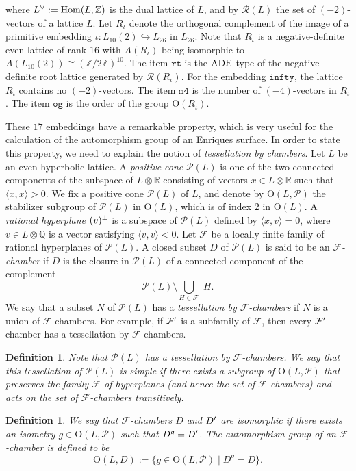\documentclass{amsart}
\newtheorem{_definition}[theorem]{Definition}
\newenvironment{definition}{\begin{_definition}\rm}{\end{_definition}}
\numberwithin{equation}{section}
\numberwithin{table}{section}
\numberwithin{figure}{section}
\newcommand{\Q}{\mathord{\mathbb  Q}}
\newcommand{\R}{\mathord{\mathbb R}}
\newcommand{\Z}{\mathord{\mathbb Z}}
\newcommand{\FFF}{\mathord{\mathcal F}}
\newcommand{\PPP}{\mathord{\mathcal P}}
\newcommand{\RRR}{\mathord{\mathcal R}}
\newcommand{\inj}{\hookrightarrow}
\newcommand{\set}[2]{\{ {#1}\mid {#2}  \}}
\newcommand{\tensor}{\otimes}
\newcommand{\sprime}{\sp\prime}
\newcommand{\sperp}{\sp{\perp}}
\newcommand{\dual}{\sp{\vee}}
\newcommand{\Hom}{\mathord{\mathrm{Hom}}}
\newcommand{\OG}{\mathord{\mathrm{O}}}
\newcommand{\ADE}{\mathord{\rm ADE}}
\newcommand{\intf}[1]{\langle #1 \rangle}
\newcommand{\OGP}[1]{\OG(#1, \PPP)}
\begin{document}
where $L\dual:=\Hom(L, \Z)$ is the dual lattice of $L$,
and by  $\RRR(L)$  the set of $(-2)$-vectors of a lattice $L$.
Let $R_{\iota}$ denote the orthogonal complement of the image of
a primitive embedding $\iota\colon L_{10}(2)\inj L_{26}$ in $L_{26}$.
Note that $R_{\iota}$ is a negative-definite even lattice of rank $16$
with  $A(R_{\iota})$ being isomorphic to $A(L_{10}(2))\cong (\Z/2\Z)^{10}$. %
The item $\texttt{rt}$ is the $\ADE$-type of the negative-definite root lattice
generated by  $\RRR(R_{\iota})$.
For the embedding %
$\texttt{infty}$, the lattice $R_{\iota}$ contains no $(-2)$-vectors.
The item $\texttt{m4}$ is the number of $(-4)$-vectors   in $R_{\iota}$.
The item $\texttt{og}$ is the order of the group  $\OG(R_{\iota})$.
\par
\medskip
These $17$ embeddings have a remarkable property,
which is very useful for the calculation of the automorphism group of
an Enriques surface.
In order to state this property,
we need to explain the notion of \emph{tessellation by chambers}.
Let $L$ be an even hyperbolic lattice.
A \emph{positive cone} $\PPP(L)$  is one of the two connected components
of the subspace of $L\tensor \R$ consisting of vectors $x\in L\tensor \R$
such that $\intf{x, x}>0$.
We fix a positive cone $\PPP(L)$ of $L$, and
denote by $\OGP{L}$
the stabilizer subgroup of $\PPP(L)$ in $\OG(L)$,
which is of index $2$ in $\OG(L)$.
A \emph{rational hyperplane} $(v)\sperp$ is a subspace of $\PPP(L)$ defined by
$\intf{x, v}=0$, where $v\in L\tensor \Q$ is a vector satisfying  $\intf{v, v}<0$.
Let $\FFF$ be a locally finite family of rational hyperplanes of $\PPP(L)$.
A closed subset $D$ of $\PPP(L)$ is said to be an \emph{$\FFF$-chamber} if
$D$ is the closure in $\PPP(L)$ of a connected component of
the complement
\[
\PPP(L)\setminus \bigcup_{H\in \FFF}\; H.
\]
We say that  a subset $N$ of $\PPP(L)$ has a \emph{tessellation by $\FFF$-chambers}
if $N$ is a union of $\FFF$-chambers.
For example, if $\FFF\sprime$ is a subfamily of $\FFF$,
then every $\FFF\sprime$-chamber has a tessellation by $\FFF$-chambers.
%
\begin{definition}
Note that  $\PPP(L)$ has a tessellation by $\FFF$-chambers.
We say that this tessellation of $\PPP(L)$
is \emph{simple} if there exists a subgroup of $\OGP{L}$
that preserves the family $\FFF$
of hyperplanes (and hence the set of $\FFF$-chambers) and acts on
the set of $\FFF$-chambers transitively.
\end{definition}
%
%
\begin{definition}
We say that $\FFF$-chambers $D$ and $D\sprime$ are \emph{isomorphic}
if there exists an isometry
$g\in \OGP{L}$ such that $D^g=D\sprime$.
The automorphism group of an $\FFF$-chamber is defined to be
\[
\OG(L, D):=\set{g\in \OGP{L}}{D^g=D}.
\]
\end{definition}
\end{document}
